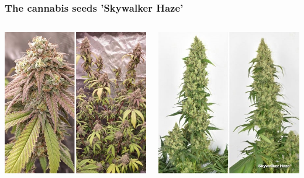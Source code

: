 \documentclass[
    12pt,
    aspectratio=1610,
    b,
    bibliography=../bibliography.bib,
    link-citations]{beamer}
\begin{document}
    \begin{frame}
        \frametitle{The cannabis seeds 'Skywalker Haze'}
        \begin{columns}[T]
            \begin{column}{.45\textwidth}
                \includegraphics[width=\linewidth]{DUTCH-PASSION_Skywalker-Haze_1}
            \end{column}
            \begin{column}{.45\textwidth}
                \includegraphics[width=\linewidth]{DUTCH-PASSION_Skywalker-Haze_2}
            \end{column}
        \end{columns}
    \end{frame}
\end{document}
